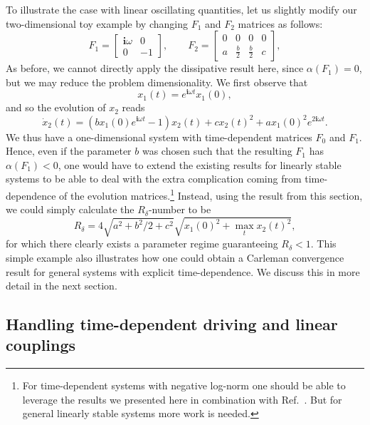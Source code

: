 \documentclass[superscriptaddress,onecolumn,nofootinbib,longbibliography,a4paper,accepted=2026-09-29]{quantumarticle}
\theoremstyle{plain}
\theoremstyle{definition}
\numberwithin{thm}{section}
\numberwithin{assumption}{section}
\numberwithin{lemma}{section}
\numberwithin{prop}{section}
\numberwithin{cor}{section}
\numberwithin{definition}{section}
\numberwithin{rmk}{section}
\numberwithin{equation}{section}
\renewcommand{\i}{\ensuremath{\mathbf{i}}}
\begin{document}
To illustrate the case with linear oscillating quantities, let us slightly modify our two-dimensional toy example by changing $F_1$ and $F_2$ matrices as follows:
\begin{equation}
    F_1 = \begin{bmatrix}
        \i\omega & 0\\
        0 & -1
    \end{bmatrix},
    \qquad
    F_2 = \begin{bmatrix}
        0 & 0 & 0 & 0 \\
        a & \frac{b}{2} & \frac{b}{2} & c
    \end{bmatrix},
\end{equation}
As before, we cannot directly apply the dissipative result here, since $\alpha(F_1)=0$, but we may reduce the problem dimensionality. We first observe that
\begin{equation}
    x_1(t) = e^{\i \omega t} x_1(0),
\end{equation}
and so the evolution of $x_2$ reads
\begin{equation}
    \dot{x}_2(t) = (b x_1(0) e^{\i \omega t} -1) x_2(t) + c x_2(t)^2  + a x_1(0)^2 e^{2 \i\omega t}.
\end{equation}
We thus have a one-dimensional system with time-dependent matrices $F_0$ and $F_1$. Hence, even if the parameter $b$ was chosen such that the resulting $F_1$ has $\alpha(F_1)<0$, one would have to extend the existing results for linearly stable systems to be able to deal with the extra complication coming from time-dependence of the evolution matrices.\footnote{For time-dependent systems with negative log-norm one should be able to leverage the results we presented here in combination with Ref.~\cite{an2024fast}. But for general linearly stable systems more work is needed.} Instead, using the result from this section, we could simply calculate the $R_\delta$-number to be
\begin{equation}
    R_\delta = 4\sqrt{a^2 +b^2/2 +c^2}\sqrt{x_1(0)^2 + \max_t x_2(t)^2},
\end{equation}
for which there clearly exists a parameter regime guaranteeing $R_\delta<1$. This simple example also illustrates how one could obtain a Carleman convergence result for general systems with explicit time-dependence. We discuss this in more detail in the next section.

\subsection{Handling time-dependent driving and linear couplings}
\label{sec:carleman_time_dependent}
\end{document}
